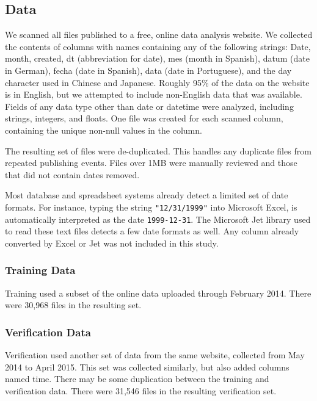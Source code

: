 \subsection{Data}

We scanned all files published to a free, online data analysis website. We collected the contents of columns with names containing any of the following strings: Date, month, created, dt (abbreviation for date), mes (month in Spanish), datum (date in German), fecha (date in Spanish), data (date in Portuguese), and the day character used in Chinese and Japanese. Roughly 95\% of the data on the website is in English, but we attempted to include non-English data that was available. Fields of any data type other than date or datetime were analyzed, including strings, integers, and floats. One file was created for each scanned column, containing the unique non-null values in the column.

The resulting set of files were de-duplicated. This handles any duplicate files from repeated publishing events. Files over 1MB were manually reviewed and those that did not contain dates removed. 

Most database and spreadsheet systems already detect a limited set of date formats. For instance, typing the string \texttt{"12/31/1999"} into Microsoft Excel, is automatically interpreted as the date \texttt{1999-12-31}. The Microsoft Jet library used to read these text files detects a few date formats as well. Any column already converted by Excel or Jet was not included in this study.


\subsubsection{Training Data}

Training used a subset of the online data uploaded through February 2014. There were 30,968 files in the resulting set.

\subsubsection{Verification Data}
Verification used another set of data from the same website, collected from May 2014 to April 2015. This set was collected similarly, but also added columns named time. There may be some duplication between the training and verification data. There were 31,546 files in the resulting verification set.

